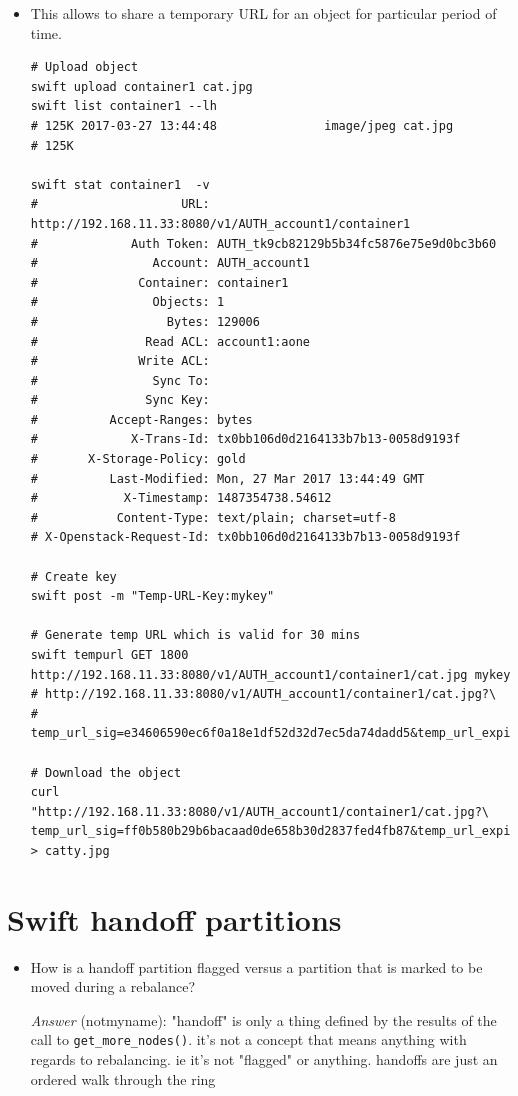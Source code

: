 \documentclass{article}
\begin{document}
\begin{itemize}
\item This allows to share a temporary URL for an object for particular
period of time.

\begin{verbatim}
# Upload object
swift upload container1 cat.jpg
swift list container1 --lh
# 125K 2017-03-27 13:44:48               image/jpeg cat.jpg
# 125K

swift stat container1  -v
#                    URL: http://192.168.11.33:8080/v1/AUTH_account1/container1
#             Auth Token: AUTH_tk9cb82129b5b34fc5876e75e9d0bc3b60
#                Account: AUTH_account1
#              Container: container1
#                Objects: 1
#                  Bytes: 129006
#               Read ACL: account1:aone
#              Write ACL:
#                Sync To:
#               Sync Key:
#          Accept-Ranges: bytes
#             X-Trans-Id: tx0bb106d0d2164133b7b13-0058d9193f
#       X-Storage-Policy: gold
#          Last-Modified: Mon, 27 Mar 2017 13:44:49 GMT
#            X-Timestamp: 1487354738.54612
#           Content-Type: text/plain; charset=utf-8
# X-Openstack-Request-Id: tx0bb106d0d2164133b7b13-0058d9193f

# Create key
swift post -m "Temp-URL-Key:mykey"

# Generate temp URL which is valid for 30 mins
swift tempurl GET 1800 http://192.168.11.33:8080/v1/AUTH_account1/container1/cat.jpg mykey
# http://192.168.11.33:8080/v1/AUTH_account1/container1/cat.jpg?\
# temp_url_sig=e34606590ec6f0a18e1df52d32d7ec5da74dadd5&temp_url_expires=1490624622

# Download the object
curl "http://192.168.11.33:8080/v1/AUTH_account1/container1/cat.jpg?\
temp_url_sig=ff0b580b29b6bacaad0de658b30d2837fed4fb87&temp_url_expires=1490624309" > catty.jpg
\end{verbatim}
\end{itemize}

\section{Swift handoff partitions}
\label{sec:org3b0db06}
\begin{itemize}
\item How is a handoff partition flagged versus a partition that is
marked to be moved during a rebalance?

\emph{Answer} (notmyname): "handoff" is only a thing defined by the
results of the call to \texttt{get\_more\_nodes()}. it's not a concept
that means anything with regards to rebalancing. ie it's not
"flagged" or anything. handoffs are just an ordered walk through
the ring
\end{itemize}
\end{document}
